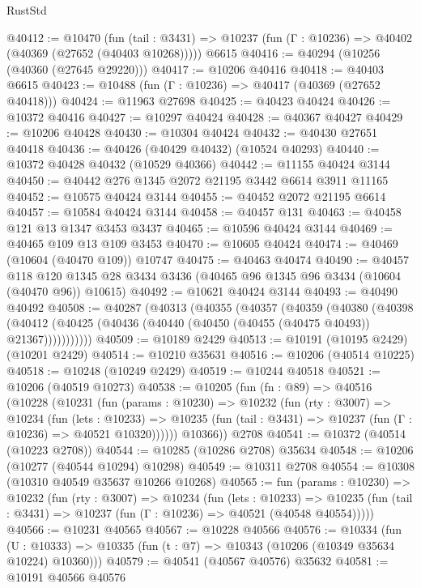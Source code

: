 \begin{lexlean}{RustStd}
\begin{coremodule}
@40412 := @10470
    (fun (tail : @3431) => @10237 (fun (Γ : @10236) => @40402 (@40369 (@27652 (@40403 @10268)))))
    @6615
@40416 := @40294 (@10256 (@40360 (@27645 @29220)))
@40417 := @10206 @40416
@40418 := @40403 @6615
@40423 := @10488 (fun (Γ : @10236) => @40417 (@40369 (@27652 @40418)))
@40424 := @11963 @27698
@40425 := @40423 @40424
@40426 := @10372 @40416
@40427 := @10297 @40424
@40428 := @40367 @40427
@40429 := @10206 @40428
@40430 := @10304 @40424
@40432 := @40430 @27651 @40418
@40436 := @40426 (@40429 @40432) (@10524 @40293)
@40440 := @10372 @40428 @40432 (@10529 @40366)
@40442 := @11155 @40424 @3144
@40450 := @40442 @276 @1345 @2072 @21195 @3442 @6614 @3911 @11165
@40452 := @10575 @40424 @3144
@40455 := @40452 @2072 @21195 @6614
@40457 := @10584 @40424 @3144
@40458 := @40457 @131
@40463 := @40458 @121 @13 @1347 @3453 @3437
@40465 := @10596 @40424 @3144
@40469 := @40465 @109 @13 @109 @3453
@40470 := @10605 @40424
@40474 := @40469 (@10604 (@40470 @109)) @10747
@40475 := @40463 @40474
@40490 := @40457
    @118
    @120
    @1345
    @28
    @3434
    @3436
    (@40465 @96 @1345 @96 @3434 (@10604 (@40470 @96)) @10615)
@40492 := @10621 @40424 @3144
@40493 := @40490 @40492
@40508 := @40287
    (@40313
      (@40355
        (@40357
          (@40359
            (@40380
              (@40398
                (@40412 (@40425 (@40436 (@40440 (@40450 (@40455 (@40475 @40493)) @21367)))))))))))
@40509 := @10189 @2429
@40513 := @10191 (@10195 @2429) (@10201 @2429)
@40514 := @10210 @35631
@40516 := @10206 (@40514 @10225)
@40518 := @10248 (@10249 @2429)
@40519 := @10244 @40518
@40521 := @10206 (@40519 @10273)
@40538 := @10205
    (fun (fn : @89) =>
    @40516
      (@10228
        (@10231
          (fun (params : @10230) =>
          @10232
            (fun (rty : @3007) =>
            @10234
              (fun (lets : @10233) =>
              @10235 (fun (tail : @3431) => @10237 (fun (Γ : @10236) => @40521 @10320))))))
        @10366))
    @2708
@40541 := @10372 (@40514 (@10223 @2708))
@40544 := @10285 (@10286 @2708) @35634
@40548 := @10206 (@10277 (@40544 @10294) @10298)
@40549 := @10311 @2708
@40554 := @10308 (@10310 @40549 @35637 @10266 @10268)
@40565 := fun (params : @10230) =>
  @10232
    (fun (rty : @3007) =>
    @10234
      (fun (lets : @10233) =>
      @10235 (fun (tail : @3431) => @10237 (fun (Γ : @10236) => @40521 (@40548 @40554)))))
@40566 := @10231 @40565
@40567 := @10228 @40566
@40576 := @10334
    (fun (U : @10333) => @10335 (fun (t : @7) => @10343 (@10206 (@10349 @35634 @10224) @10360)))
@40579 := @40541 (@40567 @40576) @35632
@40581 := @10191 @40566 @40576

\end{coremodule}
\end{lexlean}

